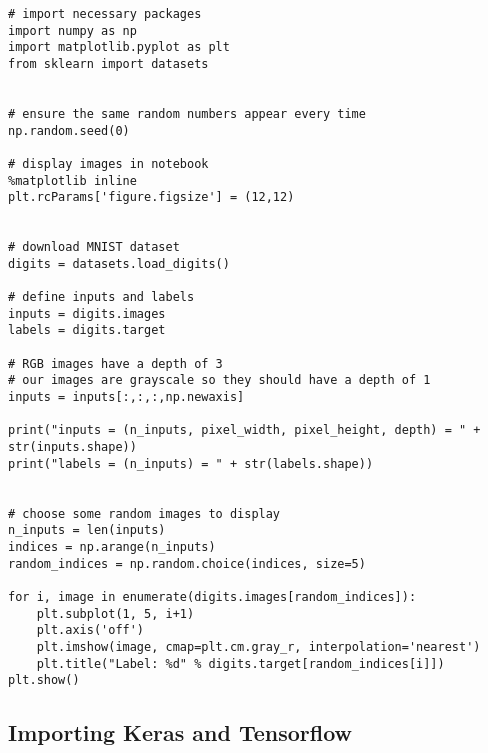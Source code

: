 \documentclass[%
oneside,                 %
final,                   %
10pt]{article}
\begin{document}
\begin{verbatim}
# import necessary packages
import numpy as np
import matplotlib.pyplot as plt
from sklearn import datasets


# ensure the same random numbers appear every time
np.random.seed(0)

# display images in notebook
%matplotlib inline
plt.rcParams['figure.figsize'] = (12,12)


# download MNIST dataset
digits = datasets.load_digits()

# define inputs and labels
inputs = digits.images
labels = digits.target

# RGB images have a depth of 3
# our images are grayscale so they should have a depth of 1
inputs = inputs[:,:,:,np.newaxis]

print("inputs = (n_inputs, pixel_width, pixel_height, depth) = " + str(inputs.shape))
print("labels = (n_inputs) = " + str(labels.shape))


# choose some random images to display
n_inputs = len(inputs)
indices = np.arange(n_inputs)
random_indices = np.random.choice(indices, size=5)

for i, image in enumerate(digits.images[random_indices]):
    plt.subplot(1, 5, i+1)
    plt.axis('off')
    plt.imshow(image, cmap=plt.cm.gray_r, interpolation='nearest')
    plt.title("Label: %d" % digits.target[random_indices[i]])
plt.show()

\end{verbatim}


\subsection*{Importing Keras and Tensorflow}
\end{document}
